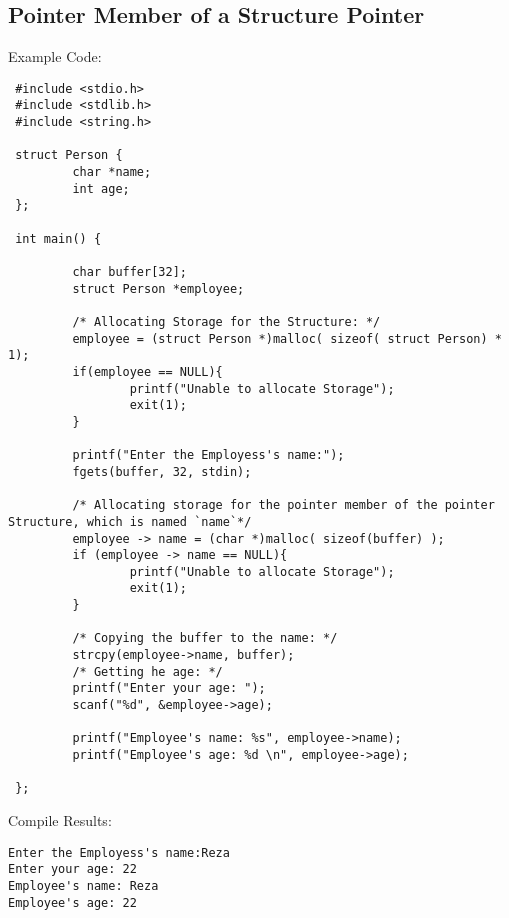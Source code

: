 \subsection{Pointer Member of a Structure Pointer}
Example Code:
\begin{lstlisting} 
 #include <stdio.h>
 #include <stdlib.h>
 #include <string.h>

 struct Person {
         char *name;
         int age;
 };

 int main() {

         char buffer[32];
         struct Person *employee;

         /* Allocating Storage for the Structure: */
         employee = (struct Person *)malloc( sizeof( struct Person) * 1);
         if(employee == NULL){
                 printf("Unable to allocate Storage");
                 exit(1);
         }

         printf("Enter the Employess's name:");
         fgets(buffer, 32, stdin);

         /* Allocating storage for the pointer member of the pointer Structure, which is named `name`*/
         employee -> name = (char *)malloc( sizeof(buffer) );
         if (employee -> name == NULL){
                 printf("Unable to allocate Storage");
                 exit(1);
         }

         /* Copying the buffer to the name: */
         strcpy(employee->name, buffer);
         /* Getting he age: */
         printf("Enter your age: ");
         scanf("%d", &employee->age);

         printf("Employee's name: %s", employee->name);
         printf("Employee's age: %d \n", employee->age);

 };
\end{lstlisting}

Compile Results:
\begin{lstlisting} 
Enter the Employess's name:Reza
Enter your age: 22
Employee's name: Reza
Employee's age: 22
\end{lstlisting}
